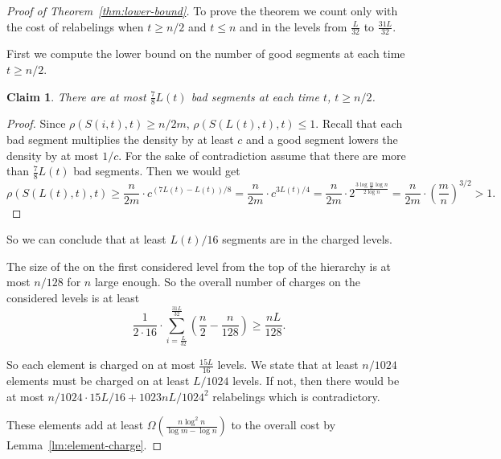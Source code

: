 \documentclass[11pt]{article} %
\newcommand{\density}[2]{\rho(#1, #2)}
\newcommand{\segment}[2]{S(#1, #2)}
\newtheorem{claim}[definition]{Claim}
\begin{document}
\begin{proof}[Proof of Theorem~\ref{thm:lower-bound}]
To prove the theorem we count only with the cost of relabelings when $t \geq n/2$ and $t \leq n$ and in the levels from $\frac{L}{32}$ to $\frac{31L}{32}$.

First we compute the lower bound on the number of good segments at each time $t \geq n/2$.

\begin{claim}
There are at most $\frac{7}{8} L(t)$ bad segments at each time $t$, $t \geq n/2$.
\end{claim}
\begin{proof}
Since $\density{\segment{i}{t}}{t} \geq n/2m$, $\density{\segment{L(t)}{t}}{t} \leq 1$.
Recall that each bad segment multiplies the density by at least $c$ and a good segment lowers the density by at most $1/c$.
For the sake of contradiction assume that there are more than $\frac{7}{8} L(t)$ bad segments.
Then we would get
\[
\density{\segment{L(t)}{t}}{t} \geq \frac{n}{2m} \cdot c^{(7L(t) - L(t))/8} = \frac{n}{2m} \cdot c^{3L(t)/4} = \frac{n}{2m} \cdot 2^{\frac{3\log\frac{m}{n} \log n}{2\log n}} = \frac{n}{2m} \cdot \left(\frac{m}{n}\right)^{3/2} > 1. 
\]
\end{proof}

So we can conclude that at least $L(t)/16$ segments are in the charged levels.

The size of the on the first considered level from the top of the hierarchy is at most $n / 128$ for $n$ large enough.
So the overall number of charges on the considered levels is at least
\[
\frac{1}{2 \cdot 16} \cdot \sum_{i = \frac{L}{32}}^{\frac{31 L}{32}} \left(\frac{n}{2} - \frac{n}{128}\right) \geq \frac{nL}{128}.
\]

So each element is charged on at most $\frac{15 L}{16}$ levels.
We state that at least $n/1024$ elements must be charged on at least $L/1024$ levels.
If not, then there would be at most $n/1024 \cdot 15L/16 + 1023nL/1024^2$ relabelings which is contradictory.

These elements add at least $\Omega\left(\frac{n\log^2 n}{\log m - \log n}\right)$ to the overall cost by Lemma~\ref{lm:element-charge}.
\end{proof}
\end{document}
